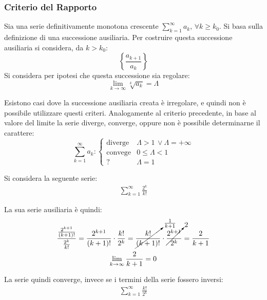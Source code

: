 \documentclass{article}
\numberwithin{equation}{subsection}
\begin{document}
\subsubsection{Criterio del Rapporto}

Sia una serie definitivamente monotona crescente $\sum_{k=1}^\infty a_k,\,\forall k\geq k_0$. 
Si basa sulla definizione di una successione ausiliaria. Per costruire questa successione ausiliaria si considera, da $k>k_0$:
\begin{equation*}
    \displaystyle\left\{\frac{a_{k+1}}{a_k}\right\}
\end{equation*}
Si considera per ipotesi che questa successione sia regolare:
\begin{equation*}
    \lim_{k\to\infty}\sqrt[k]{a_k}=\Lambda
\end{equation*}

Esistono casi dove la successione ausiliaria creata è irregolare, e quindi non è possibile utilizzare questi criteri. %
Analogamente al criterio precedente, in base al valore del limite la serie diverge, converge, oppure non è possibile determinarne il carattere:
\begin{equation}
    \displaystyle\sum_{k=1}^\infty a_k:\begin{cases}
        \text{diverge}&\Lambda > 1\,\lor\Lambda=+\infty\\
        \text{convege}&0\leq\Lambda<1\\
        ?&\Lambda=1
    \end{cases}
\end{equation}


Si considera la seguente serie:
\begin{gather*}
    \displaystyle\sum_{k=1}^\infty\frac{2^k}{k!}
\end{gather*}

La sua serie ausiliaria è quindi:
\begin{gather*}
    \displaystyle\frac{\frac{2^{k+1}}{(k+1)!}}{\frac{2^k}{k!}}=
    \frac{2^{k+1}}{(k+1)!}\cdot\frac{k!}{2^k}=\cancelto{\frac{1}{k+1}}{\frac{k!}{(k+1)!}}\cdot\cancelto{2}{\frac{2^{k+1}}{2^k}}=\frac{2}{k+1}\\
    \lim_{k\to\infty}\frac{2}{k+1}=0
\end{gather*}

La serie quindi converge, invece se i termini della serie fossero inversi:
\begin{gather*}
    \displaystyle\sum_{k=1}^\infty\frac{k!}{2^k}
\end{gather*}
\end{document}
